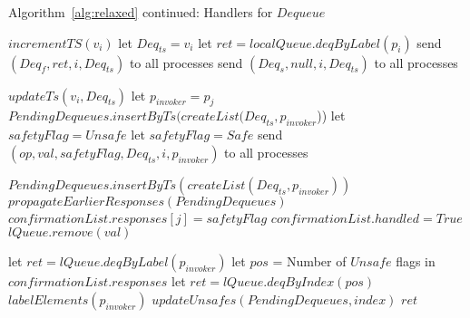 \documentclass[a4paper,USenglish]{lipics-v2021} %
\begin{document}
\begin{algorithm}
  \caption{Algorithm~\ref{alg:relaxed} continued: Handlers for $Dequeue$}
  \begin{algorithmic}[1]
      \State $incrementTS(v_i)$
      \State let $Deq_{ts} = v_i$
        \State let $ret = localQueue.deqByLabel(p_i)$
        \State send $(Deq_f, ret, i, Deq_{ts})$ to all processes
      \Else
        \State send $(Deq_s, null, i, Deq_{ts})$ to all processes
      \EndIf
    \EndFunction

      \State $updateTs(v_i, Deq_{ts})$
      \State let $p_{invoker} = p_j$
      \State $PendingDequeues.insertByTs(createList(Deq_{ts}, p_{invoker}$))
      \EndIf
        \State let $safetyFlag = Unsafe$
      \Else
        \State let $safetyFlag = Safe$
      \EndIf
      \State send $(op, val, safetyFlag, Deq_{ts}, i, p_{invoker})$ to all processes
    \EndFunction

        \State $PendingDequeues.insertByTs(createList(Deq_{ts}, p_{invoker}))$
      \EndIf
      \State $propagateEarlierResponses(PendingDequeues)$ 
          \State $confirmationList.responses[j] = safetyFlag$
        \EndIf 
          \State $confirmationList.handled = True$ 
            \State $lQueue.remove(val)$
          \EndIf 
            \State \Return
          \EndIf

          \State let $ret = lQueue.deqByLabel(p_{invoker})$
          \Else 
            \State let $pos$ = Number of $Unsafe$ flags in $confirmationList.responses$
            \State let $ret = lQueue.deqByIndex(pos)$
          \EndIf
          \State $labelElements(p_{invoker})$
          \State $updateUnsafes(PendingDequeues, \textit{index})$
            \State \Return $ret$
          \EndIf
        \EndIf 
      \EndFor
    \EndFunction
  \end{algorithmic}
\end{algorithm}
\end{document}
